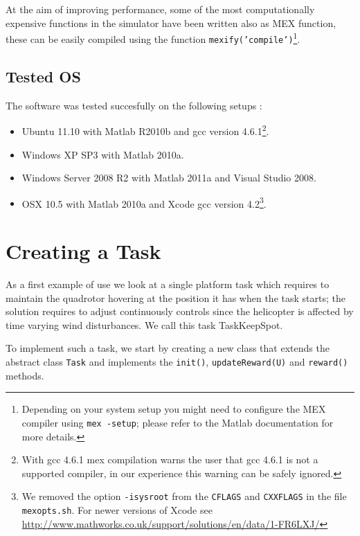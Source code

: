 \documentclass[a4paper,11pt]{report}
\begin{document}
At the aim of improving performance, some of the most computationally expensive functions in the simulator have been written also as MEX function, these can be easily compiled using the function \texttt{mexify('compile')}\footnote{Depending on your system setup you might need to configure the MEX compiler using \texttt{mex -setup}; please refer to the Matlab documentation for more details.}.

\subsection{Tested OS} \label{sec:testedos}

The software was tested succesfully on the following setups :
\begin{itemize}
 \item Ubuntu 11.10 with Matlab R2010b and gcc version 4.6.1\footnote{With gcc 4.6.1 mex compilation warns the user that gcc 4.6.1 is not a supported compiler, in our experience this warning can be safely ignored.}.
 \item Windows XP SP3 with Matlab 2010a.
 \item Windows Server 2008 R2 with Matlab 2011a and Visual Studio 2008.
 \item OSX 10.5 with Matlab 2010a and Xcode gcc version 4.2\footnote{We removed the option \texttt{-isysroot} from the \texttt{CFLAGS} and \texttt{CXXFLAGS} in the file \texttt{mexopts.sh}. For newer versions of Xcode see \url{http://www.mathworks.co.uk/support/solutions/en/data/1-FR6LXJ/}}.
\end{itemize}

\section{Creating a Task}  \label{sec:createtask}

As a first example of use we look at a single platform task which requires to maintain the quadrotor hovering at the position it has when the task starts; the solution requires to adjust continuously controls since the helicopter is affected by time varying wind disturbances. We call this task TaskKeepSpot. 
 
To implement such a task, we start by creating a new class that extends the abstract class \texttt{Task} and implements the \texttt{init()}, \texttt{updateReward(U)}  and \texttt{reward()} methods.
\end{document}
